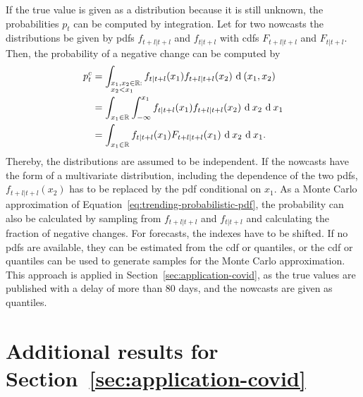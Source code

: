 \documentclass[pdflatex]{sn-jnl}
\theoremstyle{plain}%
\theoremstyle{definition}
\newcommand{\R}{\mathbb{R}}
\newcommand{\pc}{p^c}
\begin{document}
If the true value is given as a distribution because it is still unknown, the probabilities $p_t$ can be computed by integration.
Let for two nowcasts the distributions be given by \acp{pdf} $f_{t+l|t+l}$ and $f_{t|t+l}$ with \acp{cdf}  $F_{t+l|t+l}$ and $F_{t|t+l}$.
Then, the probability of a negative change can be computed by
\begin{align}
    \pc_t
        &= \int_{\begin{subarray}{l}x_1, x_2 \in \R: \\ x_2 < x_1\end{subarray}} f_{t|t+l} (x_1) f_{t+l|t+l} (x_2)  \ \textrm{d} \: (x_1, x_2) \nonumber\\
        &= \int_{x_1 \in \R} \int_{-\infty}^{x_1} f_{t|t+l} (x_1) f_{t+l|t+l} (x_2)  \ \textrm{d} \: x_2 \ \textrm{d} \: x_1 \nonumber\\
        &= \int_{x_1 \in \R} f_{t|t+l} (x_1) F_{t+l|t+l} (x_1)  \ \textrm{d} \: x_2 \ \textrm{d} \: x_1 \label{eq:trending-probabilistic-pdf}.
\end{align}
Thereby, the distributions are assumed to be independent.
If the nowcasts have the form of a multivariate distribution, including the dependence of the two \acp{pdf}, $f_{t+l|t+l} (x_2)$ has to be replaced by the \ac{pdf} conditional on $x_1$.
As a Monte Carlo approximation of Equation~\eqref{eq:trending-probabilistic-pdf}, the probability can also be calculated by sampling from $f_{t+l|t+l}$ and $f_{t|t+l}$ and calculating the fraction of negative changes.
For forecasts, the indexes have to be shifted.
If no \acp{pdf} are available, they can be estimated from the \ac{cdf} or quantiles, or the \ac{cdf} or quantiles can be used to generate samples for the Monte Carlo approximation.
This approach is applied in Section~\ref{sec:application-covid}, as the true values are published with a delay of more than 80 days, and the nowcasts are given as quantiles.


\section{Additional results for Section~\ref{sec:application-covid}}\label{sec:appendix-application-covid}
\end{document}
